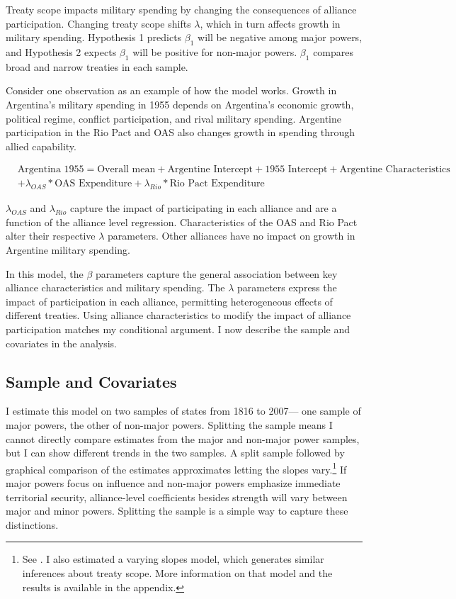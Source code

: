 \documentclass[12pt]{article}
\begin{document}
Treaty scope impacts military spending by changing the consequences of alliance participation. 
Changing treaty scope shifts $\lambda$, which in turn affects growth in military spending.
Hypothesis 1 predicts $\beta_1$ will be negative among major powers, and Hypothesis 2 expects $\beta_1$ will be positive for non-major powers.
$\beta_1$ compares broad and narrow treaties in each sample. 


Consider one observation as an example of how the model works. 
Growth in Argentina's military spending in 1955 depends on Argentina's economic growth, political regime, conflict participation, and rival military spending. 
Argentine participation in the Rio Pact and OAS also changes growth in spending through allied capability. 


\begin{equation}
\begin{split}
& \mbox{Argentina 1955} = \mbox{Overall mean}
+ \mbox{Argentine Intercept} + \mbox{1955 Intercept} 
+ \mbox{Argentine Characteristics} \\
& + \lambda_{OAS} * \mbox{OAS Expenditure} + \lambda_{Rio} * \mbox{Rio Pact Expenditure}
\end{split} 
\end{equation}


$\lambda_{OAS}$ and $\lambda_{Rio}$ capture the impact of participating in each alliance and are a function of the alliance level regression. 
Characteristics of the OAS and Rio Pact alter their respective $\lambda$ parameters.
Other alliances have no impact on growth in Argentine military spending. 


In this model, the $\beta$ parameters capture the general association between key alliance characteristics and military spending. 
The $\lambda$ parameters express the impact of participation in each alliance, permitting heterogeneous effects of different treaties. 
Using alliance characteristics to modify the impact of alliance participation matches my conditional argument. 
I now describe the sample and covariates in the analysis.  



\subsection{Sample and Covariates} 

I estimate this model on two samples of states from 1816 to 2007--- one sample of major powers, the other of non-major powers. 
Splitting the sample means I cannot directly compare estimates from the major and non-major power samples, but I can show different trends in the two samples. 
A split sample followed by graphical comparison of the estimates approximates letting the slopes vary.\footnote{See \citet{GelmanHill2007}. I also estimated a varying slopes model, which generates similar inferences about treaty scope. More information on that model and the results is available in the appendix.}
If major powers focus on influence and non-major powers emphasize immediate territorial security, alliance-level coefficients besides strength will vary between major and minor powers.
Splitting the sample is a simple way to capture these distinctions. 
\end{document}
